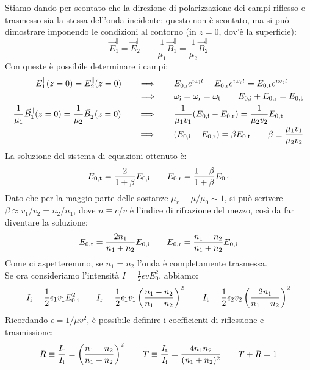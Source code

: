 Stiamo dando per scontato che la direzione di polarizzazione dei campi riflesso e trasmesso sia la stessa dell'onda incidente: questo non è scontato, ma si può dimostrare imponendo le condizioni al contorno (in $ z = 0 $, dov'è la superficie):
\begin{equation}
	\vec{E}_1^{\parallel} = \vec{E}_2^{\parallel} \qquad \frac{1}{\mu_1}\vec{B}_1^{\parallel} = \frac{1}{\mu_2}\vec{B}_2^{\parallel}
	\label{eq:53}
\end{equation}
Con queste è possibile determinare i campi:
\begin{align}
	\begin{split}
		E_1^{\parallel}(z=0) = E_2^{\parallel}(z=0) &\qquad\Longrightarrow\qquad E_{0,\text{i}} e^{i\omega_{\text{i}} t} + E_{0,\text{r}} e^{i\omega_{\text{r}} t} = E_{0,\text{t}} e^{i\omega_{\text{t}} t} \\ 
							    &\qquad\Longrightarrow\qquad \omega_{\text{i}} = \omega_{\text{r}} = \omega_{\text{t}} \qquad E_{0,\text{i}} + E_{0,\text{r}} = E_{0,\text{t}}
	\end{split}
	\\ 
	\begin{split}
		\frac{1}{\mu_1}\vec{B}_1^{\parallel}(z=0) = \frac{1}{\mu_2}\vec{B}_2^{\parallel}(z=0) &\qquad\Longrightarrow\qquad \frac{1}{\mu_1 v_1} (E_{0,\text{i}} - E_{0,\text{r}}) = \frac{1}{\mu_2 v_2} E_{0,\text{t}} \\ 
												      &\qquad\Longrightarrow\qquad (E_{0,\text{i}} - E_{0, \text{r}}) = \beta E_{0,\text{t}} \qquad \beta \equiv \frac{\mu_1 v_1}{\mu_2 v_2}
	\end{split}
	\label{eq:54-55}
\end{align}
La soluzione del sistema di equazioni ottenuto è:
\begin{equation}
	E_{0,\text{t}} = \frac{2}{1 + \beta} E_{0,\text{i}} \qquad E_{0,\text{r}} = \frac{1 - \beta}{1 + \beta} E_{0,\text{i}}
	\label{eq:56}
\end{equation}
Dato che per la maggio parte delle sostanze $ \mu_r \equiv \mu / \mu_0 \sim 1 $, si può scrivere $ \beta \approx v_1 / v_2 = n_2 / n_1 $, dove $ n \equiv c / v $ è l'indice di rifrazione del mezzo, così da far diventare la soluzione:
\begin{equation}
	E_{0,\text{t}} = \frac{2n_1}{n_1 + n_2} E_{0,\text{i}} \qquad E_{0,\text{r}} = \frac{n_1 - n_2}{n_1 + n_2} E_{0,\text{i}}
	\label{eq:57}
\end{equation}
Come ci aspetteremmo, se $ n_1 = n_2 $ l'onda è completamente trasmessa. \\ 
%
Se ora consideriamo l'intensità $ I = \frac{1}{2} \epsilon v E_0^2 $, abbiamo:
\begin{equation}
	I_{\text{i}} = \frac{1}{2} \epsilon_1 v_1 E_{0,\text{i}}^2 \qquad I_{\text{r}} = \frac{1}{2} \epsilon_1 v_1 \left( \frac{n_1 - n_2}{n_1 + n_2}\right)^2 \qquad I_{\text{t}} = \frac{1}{2} \epsilon_2 v_2 \left( \frac{2n_1}{n_1 + n_2} \right)^2
	\label{eq:58}
\end{equation}
Ricordando $ \epsilon = 1 / \mu v^2 $, è possibile definire i coefficienti di riflessione e trasmissione:
\begin{equation}
	R \equiv \frac{I_{\text{r}}}{I_{\text{i}}} = \left( \frac{n_1 - n_2}{n_1 + n_2} \right)^2 \qquad T \equiv \frac{I_{\text{t}}}{I_{\text{i}}} = \frac{4 n_1 n_2}{(n_1 + n_2)^2} \qquad T + R = 1
	\label{eq:59}
\end{equation}

